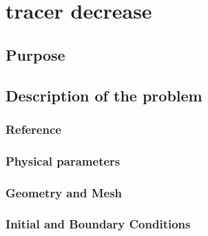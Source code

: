 \chapter{tracer decrease}
%

%
\section{Purpose}
%

%
\section{Description of the problem}
%

%
%
\subsection{Reference}
%

%
%
\subsection{Physical parameters}
%

%
%
\subsection{Geometry and Mesh}
%

%
%
\subsection{Initial and Boundary Conditions}
%

%
%
